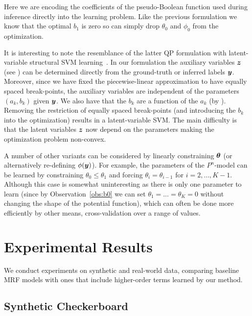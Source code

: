 \documentclass[10pt,journal,letterpaper,compsoc]{IEEEtran}
\renewcommand{\cite}{\citep}
\begin{document}
Here we are encoding the coefficients of the pseudo-Boolean function
used during inference directly into the learning problem. Like the
previous formulation we know that the optimal $b_1$ is zero so can
simply drop $\theta_0$ and $\phi_0$ from the optimization.

It is interesting to note the resemblance of the latter QP formulation
with latent-variable structural SVM learning~\cite{Yu:ICML09}. In our
formulation the auxiliary variables ${\boldsymbol{z}}$ (see
) can be determined directly from the
ground-truth or inferred labels ${\boldsymbol{y}}$. Moreover, since we have fixed
the piecewise-linear approximation to have equally spaced
break-points, the auxiliary variables are independent of the
parameters $(a_k, b_k)$ given ${\boldsymbol{y}}$. We also have that the $b_k$ are a
function of the $a_k$ (by ). Removing the restriction
of equally spaced break-points (and introducing the $b_k$ into the
optimization) results in a latent-variable SVM. The main difficulty is
that the latent variables ${\boldsymbol{z}}$ now depend on the parameters making
the optimization problem non-convex.

A number of other variants can be considered by linearly constraining
$\boldsymbol{\theta}$ (or alternatively re-defining $\phi({\boldsymbol{y}})$). For example, the
parameters of the $P^{n}$-model can be learned by constraining
$\theta_0 \leq \theta_1$ and forcing $\theta_i = \theta_{i-1}$ for $i
= 2, \ldots, K - 1$. Although this case is somewhat uninteresting as
there is only one parameter to learn (since by Observation~\ref{obs:b0}
we can set $\theta_1 = \ldots = \theta_K = 0$ without changing the
shape of the potential function), which can often be done more
efficiently by other means, \eg cross-validation over a range of
values.

\section{Experimental Results}
\label{sec:experiments}

We conduct experiments on synthetic and real-world data, comparing
baseline MRF models with ones that include higher-order terms learned
by our method.

\subsection{Synthetic Checkerboard}
\end{document}
